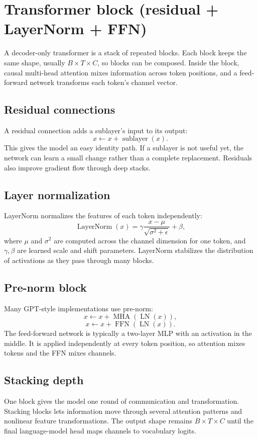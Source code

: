 \section{Transformer block (residual + LayerNorm + FFN)}\label{sec:12}

A decoder-only transformer is a stack of repeated blocks. Each block keeps the
same shape, usually $B \times T \times C$, so blocks can be composed. Inside the
block, causal multi-head attention mixes information across token positions,
and a feed-forward network transforms each token's channel vector.

\subsection*{Residual connections}
A residual connection adds a sublayer's input to its output:
\[
  x \leftarrow x + \operatorname{sublayer}(x).
\]
This gives the model an easy identity path. If a sublayer is not useful yet, the
network can learn a small change rather than a complete replacement. Residuals
also improve gradient flow through deep stacks.

\subsection*{Layer normalization}
LayerNorm normalizes the features of each token independently:
\[
  \operatorname{LayerNorm}(x)
  =
  \gamma \frac{x-\mu}{\sqrt{\sigma^2+\epsilon}} + \beta,
\]
where $\mu$ and $\sigma^2$ are computed across the channel dimension for one
token, and $\gamma,\beta$ are learned scale and shift parameters. LayerNorm
stabilizes the distribution of activations as they pass through many blocks.

\subsection*{Pre-norm block}
Many GPT-style implementations use pre-norm:
\[
  x \leftarrow x + \operatorname{MHA}(\operatorname{LN}(x)),
\]
\[
  x \leftarrow x + \operatorname{FFN}(\operatorname{LN}(x)).
\]
The feed-forward network is typically a two-layer MLP with an activation in the
middle. It is applied independently at every token position, so attention mixes
tokens and the FFN mixes channels.

\subsection*{Stacking depth}
One block gives the model one round of communication and transformation.
Stacking blocks lets information move through several attention patterns and
nonlinear feature transformations. The output shape remains $B \times T \times
C$ until the final language-model head maps channels to vocabulary logits.

